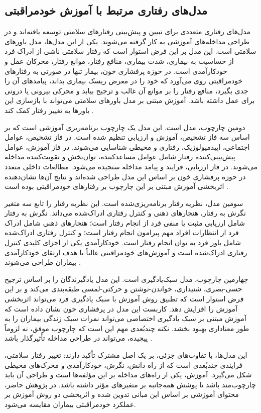 \subsection{مدل‌های رفتاری مرتبط با آموزش خودمراقبتی}
مدل‌های رفتاری متعددی برای تبیین و پیش‌بینی رفتارهای سلامتی توسعه یافته‌اند و در طراحی مداخله‌های آموزشی به کار گرفته می‌شوند. یکی از این مدل‌ها، مدل باورهای سلامتی است. این مدل بر این فرض استوار است که رفتار سلامتی ناشی از ادراک فرد از حساسیت به بیماری، شدت بیماری، منافع رفتار، موانع رفتار، محرکان عمل و خودکارآمدی است. در حوزه پرفشاری خون، بیمار تنها در صورتی به رفتارهای خودمراقبتی روی می‌آورد که خود را در معرض ریسک بیماری بداند، پیامدهای آن را جدی بگیرد، منافع رفتار را بر موانع آن غالب و ترجیح بیابد و محرکی بیرونی یا درونی برای عمل داشته باشد. آموزش مبتنی بر مدل باورهای سلامتی می‌تواند با بازسازی این باورها به تغییر رفتار کمک کند \cite{rosenstock1974hbm,ramazankhani2019hbm}.
\par
دومین چارچوب، مدل  است. این مدل یک چارچوب برنامه‌ریزی آموزشی است که بر اساس سه فاز تشخیص، آموزش و ارزیابی تنظیم شده است. در فاز تشخیص، عوامل اجتماعی، اپیدمیولوژیک، رفتاری و محیطی شناسایی می‌شوند. در فاز آموزش، عوامل پیش‌بینی‌کننده رفتار شامل عوامل مساعدکننده، توان‌بخش و تقویت‌کننده مداخله می‌شوند. در فاز ارزیابی، فرایند و پیامد مداخله سنجیده می‌شود. مطالعات داخلی متعدد در حوزه پرفشاری خون بر اساس این مدل طراحی شده‌اند و نتایج آن‌ها نشان‌دهنده اثربخشی آموزش مبتنی بر این چارچوب بر رفتارهای خودمراقبتی بوده است \cite{greenkreuter2005precede,rakhshani2024precede,abedi2020precede}.
\par
سومین مدل، نظریه رفتار برنامه‌ریزی‌شده است. این نظریه رفتار را تابع سه متغیر نگرش به رفتار، هنجارهای ذهنی و کنترل رفتاری ادراک‌شده می‌داند. نگرش به رفتار شامل ارزیابی مثبت یا منفی فرد از انجام رفتار است؛ هنجارهای ذهنی شامل ادراک فرد از انتظارات افراد مهم پیرامون انجام رفتار است؛ و کنترل رفتاری ادراک‌شده شامل باور فرد به توان انجام رفتار است. خودکارآمدی یکی از اجزای کلیدی کنترل رفتاری ادراک‌شده است و آموزش‌های خودمراقبتی غالباً با هدف ارتقای خودکارآمدی بیماران طراحی می‌شوند \cite{ajzen1991tpb}.
\par
چهارمین چارچوب، مدل سبک‌یادگیری  است. این مدل یادگیرندگان را بر اساس ترجیح حسی-بصری، شنیداری، خواندن-نوشتن و حرکتی-لمسی طبقه‌بندی می‌کند و بر این فرض استوار است که تطبیق روش آموزش با سبک یادگیری فرد می‌تواند اثربخشی آموزش را افزایش دهد. کاربست این مدل در پرفشاری خون نشان داده است که آموزش مبتنی بر سبک یادگیری اختصاصی می‌تواند نمرات سبک زندگی بیماران را به طور معناداری بهبود بخشد. نکته چندبُعدی مهم این است که چارچوب موفق، نه لزوماً پیچیده، می‌تواند در طراحی مداخله تأثیرگذار باشد \cite{fleming2001vark,ghorbani2021vark}.
\par
این مدل‌ها، با تفاوت‌های جزئی، بر یک اصل مشترک تأکید دارند: تغییر رفتار سلامتی، فرایندی چندبُعدی است که از راه دانش، نگرش، خودکارآمدی و محرک‌های محیطی شکل می‌گیرد. آموزش، یکی از راه‌های مداخله بر این مؤلفه‌ها است و طراحی آن باید چارچوب‌مند باشد تا پوشش همه‌جانبه بر متغیرهای مؤثر داشته باشد. در پژوهش حاضر، محتوای آموزشی بر اساس این مبانی تدوین شده و اثربخشی دو روش آموزش بر عملکرد خودمراقبتی بیماران مقایسه می‌شود.

